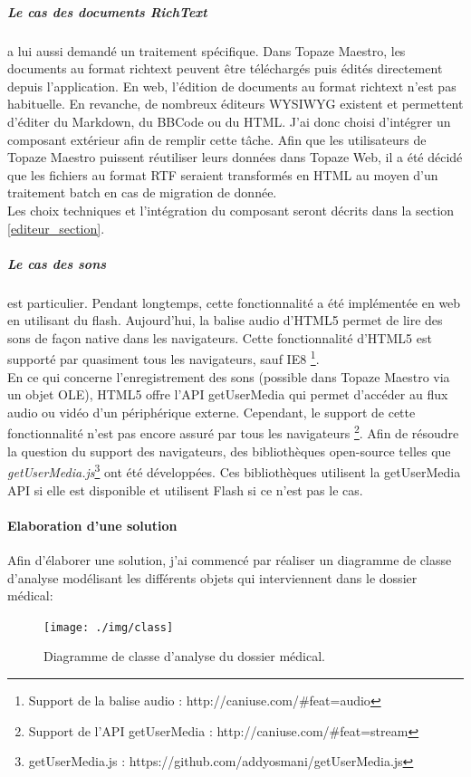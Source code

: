 \subparagraph*{Le cas des documents RichText} a lui aussi demandé un traitement spécifique. Dans Topaze Maestro, les documents au format richtext peuvent être téléchargés puis édités directement depuis l'application. En web, l'édition de documents au format richtext n'est pas habituelle. En revanche, de nombreux éditeurs \gls{WYSIWYG} existent et permettent d'éditer du Markdown, du BBCode ou du HTML. J'ai donc choisi d'intégrer un composant extérieur afin de remplir cette tâche. Afin que les utilisateurs de Topaze Maestro puissent réutiliser leurs données dans Topaze Web, il a été décidé que les fichiers au format RTF seraient transformés en HTML au moyen d'un traitement batch en cas de migration de donnée. \\
Les choix techniques et l'intégration du composant seront décrits dans la section \ref{editeur_section}.

\subparagraph*{Le cas des sons} est particulier. Pendant longtemps, cette fonctionnalité a été implémentée en web en utilisant du flash. Aujourd'hui, la balise audio d'HTML5 permet de lire des sons de façon native dans les navigateurs. Cette fonctionnalité d'HTML5 est supporté par quasiment tous les navigateurs, sauf IE8 \footnote{Support de la balise audio : http://caniuse.com/\#feat=audio}. \\
En ce qui concerne l'enregistrement des sons (possible dans Topaze Maestro via un objet OLE), HTML5 offre l'API getUserMedia qui permet d'accéder au flux audio ou vidéo d'un périphérique externe. Cependant, le support de cette fonctionnalité n'est pas encore assuré par tous les navigateurs \footnote{Support de l'API getUserMedia : http://caniuse.com/\#feat=stream}. Afin de résoudre la question du support des navigateurs, des bibliothèques open-source telles que \textit{getUserMedia.js}\footnote{getUserMedia.js : https://github.com/addyosmani/getUserMedia.js} ont été développées. Ces bibliothèques utilisent la getUserMedia API si elle est disponible et utilisent Flash si ce n'est pas le cas.

\paragraph{Elaboration d'une solution\\}
Afin d'élaborer une solution, j'ai commencé par réaliser un diagramme de classe d'analyse modélisant les différents objets qui interviennent dans le dossier médical:

\begin{figure}[H]
  \centering
  \texttt{[image: ./img/class]}
  \caption{\label{fig:mb_va_ast} Diagramme de classe d'analyse du dossier médical.}
\end{figure}

